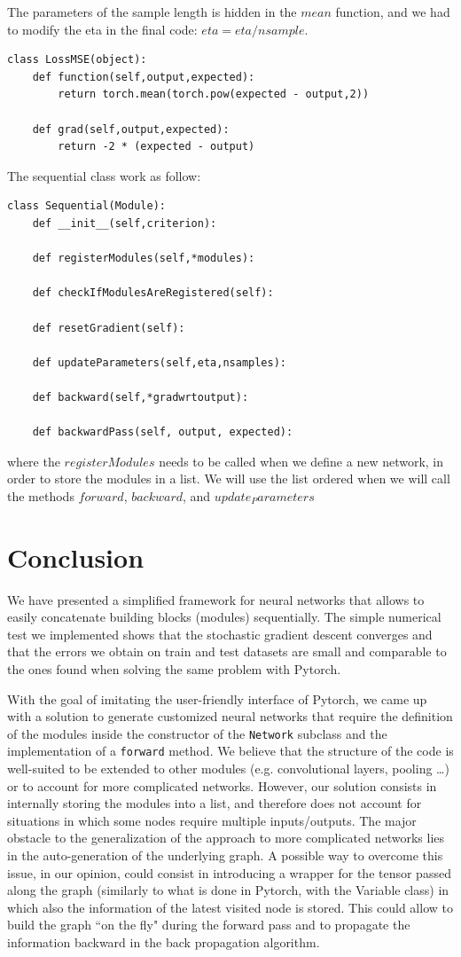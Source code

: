 \documentclass[10pt,final,a4paper]{article}
\begin{document}
The parameters of the sample length is hidden in the $mean$ function, and we had to modify the eta in the final code: $eta=eta/nsample$.
\begin{verbatim}
class LossMSE(object):
    def function(self,output,expected):
        return torch.mean(torch.pow(expected - output,2))

    def grad(self,output,expected):
        return -2 * (expected - output)
\end{verbatim}

The sequential class work as follow:
\begin{verbatim}
class Sequential(Module):
    def __init__(self,criterion):

    def registerModules(self,*modules):

    def checkIfModulesAreRegistered(self):

    def resetGradient(self):

    def updateParameters(self,eta,nsamples):

    def backward(self,*gradwrtoutput):

    def backwardPass(self, output, expected):

\end{verbatim}
where the $registerModules$ needs to be called when we define a new network, in order to store the modules in a list. We will use the list ordered when we will call the methods $forward$, $backward$, and $update_Parameters$

\section{Conclusion}
We have presented a simplified framework for neural networks that allows to easily concatenate building blocks (modules) sequentially. The simple numerical test we implemented shows that the stochastic gradient descent converges and that the errors we obtain on train and test datasets are small and comparable to the ones found when solving the same problem with Pytorch. 

With the goal of imitating the user-friendly interface of Pytorch, we came up with a solution to generate customized neural networks that require the definition of the modules inside the constructor of the \verb|Network| subclass and the implementation of a \verb|forward| method. We believe that the structure of the code is well-suited to be extended to other modules (e.g. convolutional layers, pooling \ldots) or to account for more complicated networks. However, our solution consists in internally storing the modules into a list, and therefore does not account for situations in which some nodes require multiple inputs/outputs. The major obstacle to the generalization of the approach to more complicated networks lies in the auto-generation of the underlying graph. A possible way to overcome this issue, in our opinion, could consist in introducing a wrapper for the tensor passed along the graph (similarly to what is done in Pytorch, with the Variable class) in which also the information of the latest visited node is stored. This could allow to build the graph ``on the fly" during the forward pass and to propagate the information backward in the back propagation algorithm.
\end{document}
